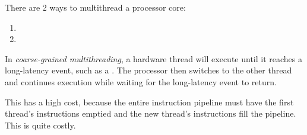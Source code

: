 There are 2 ways to multithread a processor core:
\begin{enumerate}[noitemsep]
\item {}
\item {}
\end{enumerate}

\begin{definition}\label{def:Coarse_Grained_Multithreading}
  In \emph{coarse-grained multithreading}, a hardware thread will execute until it reaches a long-latency event, such as a .
  The processor then switches to the other thread and continues execution while waiting for the long-latency event to return.

  This has a high cost, because the entire instruction pipeline must have the first thread's instructions emptied and the new thread's instructions fill the pipeline.
  This is quite costly.
\end{definition}

